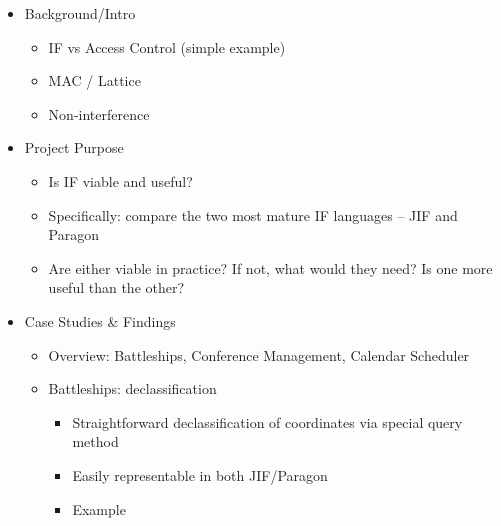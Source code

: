 \begin{itemize}
	
	\item Background/Intro
	
	\begin{itemize}
		
		\item IF vs Access Control (simple example)
		
		\item MAC / Lattice
		
		\item Non-interference
		
	\end{itemize}

	\item Project Purpose
	
	\begin{itemize}
		
		\item Is IF viable and useful?
		
		\item Specifically: compare the two most mature IF languages -- JIF and Paragon
		
		\item Are either viable in practice? If not, what would they need? Is one more useful than the other?
		
	\end{itemize}
	
	\item Case Studies \& Findings
	
	\begin{itemize}
		
		\item Overview: Battleships, Conference Management, Calendar Scheduler
		
		\item Battleships: declassification
		
		\begin{itemize}
			
			\item Straightforward declassification of coordinates via special query method
			
			\item Easily representable in both JIF/Paragon
			
			\item Example
			
		\end{itemize}
	

\end{itemize}
\end{itemize}
